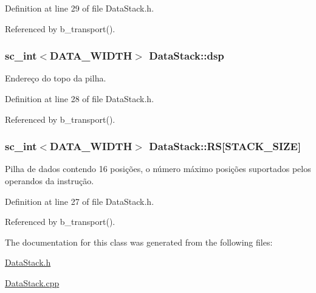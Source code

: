 Definition at line 29 of file Data\+Stack.\+h.



Referenced by b\+\_\+transport().

\hypertarget{classDataStack_a98e11c938a1afac35622e5fb2ed6f9fa}{
\subsubsection[{dsp}]{\setlength{\rightskip}{0pt plus 5cm}sc\+\_\+int$<${\bf D\+A\+T\+A\+\_\+\+W\+I\+D\+T\+H}$>$ Data\+Stack\+::dsp\hspace{0.3cm}{\ttfamily [private]}}}\label{classDataStack_a98e11c938a1afac35622e5fb2ed6f9fa}
Endereço do topo da pilha. 

Definition at line 28 of file Data\+Stack.\+h.



Referenced by b\+\_\+transport().

\hypertarget{classDataStack_a096402db3243ca7cb735097c6f507464}{
\subsubsection[{R\+S}]{\setlength{\rightskip}{0pt plus 5cm}sc\+\_\+int$<${\bf D\+A\+T\+A\+\_\+\+W\+I\+D\+T\+H}$>$ Data\+Stack\+::\+R\+S\mbox{[}{\bf S\+T\+A\+C\+K\+\_\+\+S\+I\+Z\+E}\mbox{]}\hspace{0.3cm}{\ttfamily [private]}}}\label{classDataStack_a096402db3243ca7cb735097c6f507464}
Pilha de dados contendo 16 posições, o número máximo posições suportados pelos operandos da instrução. 

Definition at line 27 of file Data\+Stack.\+h.



Referenced by b\+\_\+transport().



The documentation for this class was generated from the following files\+:\begin{DoxyCompactItemize}
\item 
\hyperlink{DataStack_8h}{Data\+Stack.\+h}\item 
\hyperlink{DataStack_8cpp}{Data\+Stack.\+cpp}\end{DoxyCompactItemize}
